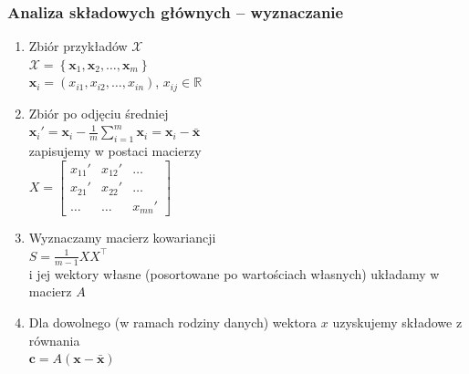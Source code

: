 \documentclass[11pt, xcolor={dvipsnames,svgnames},aspectratio=169]{beamer}
\theoremstyle{plain}
\theoremstyle{plain}
\begin{document}
\begin{frame}
	\frametitle{Analiza składowych głównych -- wyznaczanie}
	\begin{enumerate}
		\item Zbiór przykładów $\mathcal{X}$\\$\mathcal{X}=\left\{\mathbf{x}_1, \mathbf{x}_2, \dots, \mathbf{x}_m\right\}$\\ $\mathbf{x}_i=(x_{i1}, x_{i2}, \dots, x_{in})$, $x_{ij}\in\mathbb{R}$\pause
		\item Zbiór po odjęciu średniej\\
		$\mathbf{x}_i'=\mathbf{x}_i - \frac{1}{m}\sum_{i=1}^m \mathbf{x}_i=\mathbf{x}_i - \bar{\mathbf{x}}$\\\pause
		zapisujemy w postaci macierzy\\$X=\begin{bmatrix}
			x_{11}' & x_{12}' & \dots\\
			x_{21}' & x_{22}' & \dots\\	
			\dots & \dots & x_{mn}'
		\end{bmatrix}$\pause
		\item Wyznaczamy macierz kowariancji\\
		$S= \frac{1}{m-1}X X^\top$\\\pause
		i jej wektory własne (posortowane po wartościach własnych) układamy w macierz $A$\pause
		\item Dla dowolnego (w ramach rodziny danych) wektora $x$ uzyskujemy składowe z równania\\
		$\mathbf{c} = A(\mathbf{x} - \bar{\mathbf{x}})$
	\end{enumerate}
\end{frame}
\end{document}
